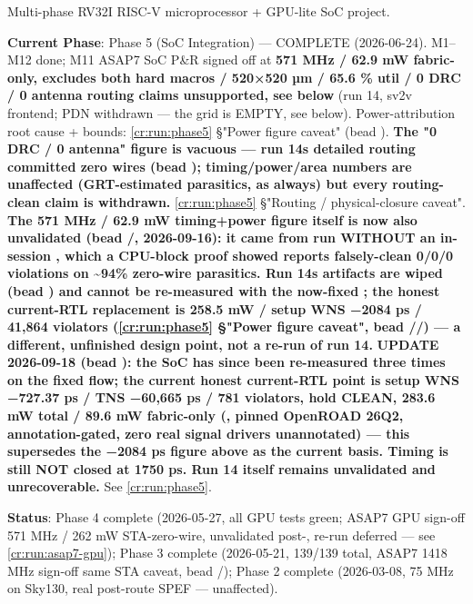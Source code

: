 \begin{record}

Multi-phase RV32I RISC-V microprocessor + GPU-lite SoC project.

\textbf{Current Phase}: Phase 5 (SoC Integration) --- \ok{} COMPLETE
(2026-06-24). M1--M12 done; M11 ASAP7 SoC P\&R signed off at \textbf{571
MHz / 62.9 mW \warn{} fabric-only, excludes both hard macros / 520×520
µm / 65.6 \% util / 0 DRC / 0 antenna \warn{} routing claims
unsupported, see below} (run 14, sv2v frontend; PDN \warn{} withdrawn
--- the grid is EMPTY, see below). Power-attribution root cause +
bounds: \cref{cr:run:phase5} §"Power figure caveat" (bead
). \textbf{The "0 DRC / 0 antenna" figure is vacuous --- run
14\textquotesingle s detailed routing committed zero wires (bead
); timing/\allowbreak{}power/\allowbreak{}area numbers are
unaffected (GRT-estimated parasitics, as always) but every routing-clean
claim is withdrawn.} \cref{cr:run:phase5} §"Routing /
physical-closure caveat". \warn{} \textbf{The 571 MHz / 62.9 mW
timing+power figure itself is now also unvalidated (bead
/, 2026-09-16): it came from
 run WITHOUT an in-session
, which a CPU-block proof showed reports
falsely-clean 0/0/0 violations on \textasciitilde94\% zero-wire
parasitics. Run 14\textquotesingle s artifacts are wiped (bead
) and cannot be re-measured with the now-fixed
; the honest current-RTL replacement
is 258.5 mW / setup WNS −2084 ps / 41,864 violators
(\cref{cr:run:phase5} §"Power figure caveat", bead
//) --- a different, unfinished design
point, not a re-run of run 14.} \ok{} \textbf{UPDATE 2026-09-18 (bead
): the SoC has since been re-measured three times on the fixed
flow; the current honest current-RTL point is setup WNS −727.37 ps / TNS
−60,665 ps / 781 violators, hold CLEAN, 283.6 mW total / 89.6 mW
fabric-only (, pinned OpenROAD 26Q2,
annotation-gated, zero real signal drivers unannotated) --- this
supersedes the −2084 ps figure above as the current basis. Timing is
still NOT closed at 1750 ps. Run 14 itself remains unvalidated and
unrecoverable.} See \cref{cr:run:phase5}.

\textbf{Status}: Phase 4 complete (2026-05-27, all GPU tests green;
ASAP7 GPU sign-off 571 MHz / 262 mW \warn{} STA-zero-wire, unvalidated
post-, re-run deferred --- see
\cref{cr:run:asap7-gpu}); Phase 3 complete (2026-05-21,
139/139 total, ASAP7 1418 MHz sign-off \warn{} same STA caveat, bead
/); Phase 2 complete (2026-03-08, 75 MHz on Sky130,
real post-route SPEF --- unaffected).


\end{record}
